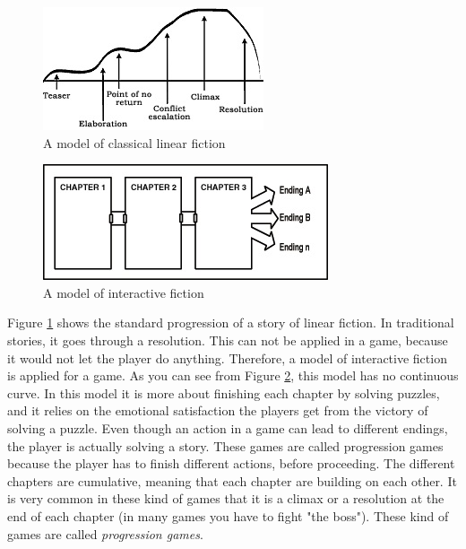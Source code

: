 \begin{figure}
\begin{center}
\includegraphics[scale=1.0]{linearFiction}
\caption[Classical linear fiction]{A model of classical linear fiction \cite{understandingvg}}
\label{fig:linearfiction}
\end{center}
\end{figure} 
\begin{figure}
\begin{center}
\includegraphics[scale=1.0]{interactiveFiction}
\caption[Interactive fiction]{A model of interactive fiction \cite{understandingvg}}
\label{fig:interactivefiction}
\end{center}
\end{figure} 

Figure \ref{fig:linearfiction} shows the standard progression of a story of linear fiction. In traditional stories, it goes through a resolution. This can not be applied in a game, because it would not let the player do anything. Therefore, a model of interactive fiction is applied for a game. As you can see from Figure \ref{fig:interactivefiction}, this model has no continuous curve. In this model it is more about finishing each chapter by solving puzzles, and it relies on the emotional satisfaction the players get from the victory of solving a puzzle. Even though an action in a game can lead to different endings, the player is actually solving a story. These games are called progression games because the player has to finish different actions, before proceeding. The different chapters are cumulative, meaning that each chapter are building on each other. It is very common in these kind of games that it is a climax or a resolution at the end of each chapter (in many games you have to fight "the boss"). These kind of games are called \emph{progression games}. 

